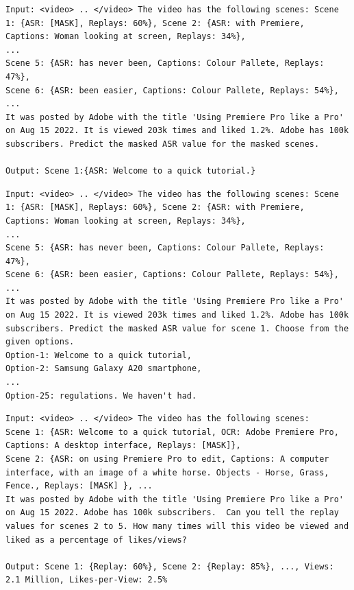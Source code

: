 \begin{lstlisting}[caption={Verbalization pattern to teach behavior in the reverse direction (predicting content given behavior):},frame=single,label={listing-content-simulation-verbalization},basicstyle=\scriptsize]
Input: <video> .. </video> The video has the following scenes: Scene 1: {ASR: [MASK], Replays: 60%}, Scene 2: {ASR: with Premiere, Captions: Woman looking at screen, Replays: 34%},
...
Scene 5: {ASR: has never been, Captions: Colour Pallete, Replays: 47%},
Scene 6: {ASR: been easier, Captions: Colour Pallete, Replays: 54%},
...
It was posted by Adobe with the title 'Using Premiere Pro like a Pro' on Aug 15 2022. It is viewed 203k times and liked 1.2%. Adobe has 100k subscribers. Predict the masked ASR value for the masked scenes.

Output: Scene 1:{ASR: Welcome to a quick tutorial.}
\end{lstlisting}



\begin{lstlisting}[caption={Verbalization pattern of videos for the content simulation task:},frame=single,label={listing-video-content-simulation},basicstyle=\scriptsize]
Input: <video> .. </video> The video has the following scenes: Scene 1: {ASR: [MASK], Replays: 60%}, Scene 2: {ASR: with Premiere, Captions: Woman looking at screen, Replays: 34%},
...
Scene 5: {ASR: has never been, Captions: Colour Pallete, Replays: 47%},
Scene 6: {ASR: been easier, Captions: Colour Pallete, Replays: 54%},
...
It was posted by Adobe with the title 'Using Premiere Pro like a Pro' on Aug 15 2022. It is viewed 203k times and liked 1.2%. Adobe has 100k subscribers. Predict the masked ASR value for scene 1. Choose from the given options.
Option-1: Welcome to a quick tutorial, 
Option-2: Samsung Galaxy A20 smartphone,
...
Option-25: regulations. We haven't had.
\end{lstlisting}

\begin{lstlisting}[caption={Verbalization pattern of videos for the behavior simulation task:},frame=single,label={listing:behavior-simulation-video-verbalization},basicstyle=\scriptsize]
Input: <video> .. </video> The video has the following scenes: 
Scene 1: {ASR: Welcome to a quick tutorial, OCR: Adobe Premiere Pro, Captions: A desktop interface, Replays: [MASK]}, 
Scene 2: {ASR: on using Premiere Pro to edit, Captions: A computer interface, with an image of a white horse. Objects - Horse, Grass, Fence., Replays: [MASK] }, ... 
It was posted by Adobe with the title 'Using Premiere Pro like a Pro' on Aug 15 2022. Adobe has 100k subscribers.  Can you tell the replay values for scenes 2 to 5. How many times will this video be viewed and liked as a percentage of likes/views? 

Output: Scene 1: {Replay: 60%}, Scene 2: {Replay: 85%}, ..., Views: 2.1 Million, Likes-per-View: 2.5%
\end{lstlisting}




